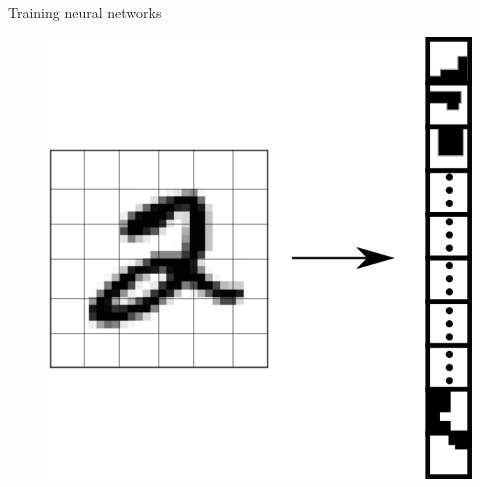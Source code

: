 \documentclass[10pt]{beamer}
\begin{document}
\begin{frame}{Training neural networks}
{\begin{figure}
		\includegraphics[scale=0.6]{backpropagation_3}
	\end{figure}}
\end{frame}
\end{document}
